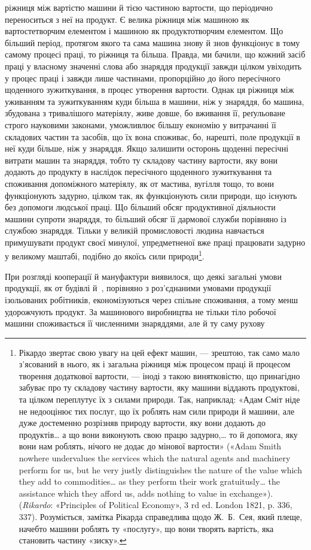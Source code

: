 \parcont{}  %
ріжниця між вартістю машини й тією частиною вартости, що
періодично переноситься з неї на продукт. Є велика ріжниця між
машиною як вартостетворчим елементом і машиною як продуктотворчим
елементом. Що більший період, протягом якого та сама
машина знову й знов функціонує в тому самому процесі праці,
то ріжниця та більша. Правда, ми бачили, що кожний засіб праці
у власному значенні слова або знаряддя продукції завжди цілком
увіходить у процес праці і завжди лише частинами, пропорційно
до його пересічного щоденного зужиткування, в процес утворення
вартости. Однак ця ріжниця між уживанням та зужиткуванням
куди більша в машини, ніж у знаряддя, бо машина, збудована
з тривалішого матеріялу, живе довше, бо вживання її, реґульоване
строго науковими законами, уможливлює більшу економію
у витрачанні її складових частин та засобів, що їх вона споживає,
бо, нарешті, поле продукції в неї куди більше, ніж у знаряддя.
Якщо залишити осторонь щоденні пересічні витрати машин та
знаряддя, тобто ту складову частину вартости, яку вони додають
до продукту в наслідок пересічного щоденного зужиткування
та споживання допоміжного матеріялу, як от мастива, вугілля
тощо, то вони функціонують задурно, цілком так, як функціонують
сили природи, що існують без допомоги людської праці.
Що більший обсяг продуктивної діяльности машини супроти
знаряддя, то більший обсяг її дармової служби порівняно із
службою знаряддя. Тільки у великій промисловості людина
навчається примушувати продукт своєї минулої, упредметненої
вже праці працювати задурно у великому маштабі, подібно до
якоїсь сили природи\footnote{
Рікардо звертає свою увагу на цей ефект машин, — зрештою,
так само мало з’ясований в нього, як і загальна ріжниця між процесом
праці й процесом творення додаткової вартости, — іноді з такою винятковістю,
що принагідно забуває про ту складову частину вартости, яку
машини віддають продуктові, та цілком переплутує їх з силами природи.
Так, наприклад: «Адам Сміт ніде не недооцінює тих послуг, що їх роблять
нам сили природи й машини, але дуже достеменно розрізняв природу
вартости, яку вони додають до продуктів\dots{} а що вони виконують свою
працю задурно,\dots{} то й допомога, яку вони нам роблять, нічого не додає
до мінової вартости» («Adam Smith nowhere undervalues the services
which the natural agents and machinery perform for us, but he very justly
distinguishes the nature of the value which they add to commodities\dots{} as
they perform their work gratuitusly\dots{} the assistance which they afford
us, adds nothing to value in exchange»). (\emph{Rikardo}: «Principles of
Political Economy», 3 rd ed. London 1821, p. 336, 337). Розуміється,
замітка Рікарда справедлива щодо Ж.~Б.~Сея, який плеще, начебто машини
роблять ту «послугу», що вони творять вартість, яка становить
частину «зиску».
}.

При розгляді кооперації й мануфактури виявилося, що деякі
загальні умови продукції, як от будівлі й~, порівняно з роз’єднаними
умовами продукції ізольованих робітників, економізуються
через спільне споживання, а тому менш удорожчують продукт.
За машинового виробництва не тільки тіло робочої машини
споживається її численними знаряддями, але й ту саму рухову
\parbreak{}  %
